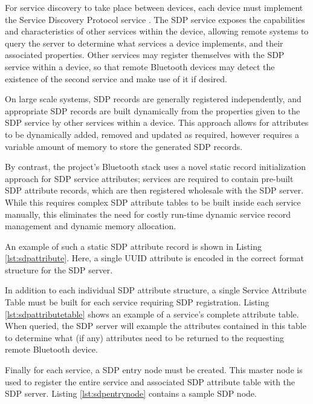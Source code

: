 For service discovery to take place between devices, each device must implement the Service Discovery Protocol service \cite{bt2p1specs_sdp}. The SDP service exposes the capabilities and characteristics of other services within the device, allowing remote systems to query the server to determine what services a device implements, and their associated properties. Other services may register themselves with the SDP service within a device, so that remote Bluetooth devices may detect the existence of the second service and make use of it if desired.

On large scale systems, SDP records are generally registered independently, and appropriate SDP records are built dynamically from the properties given to the SDP service by other services within a device. This approach allows for attributes to be dynamically added, removed and updated as required, however requires a variable amount of memory to store the generated SDP records. 

By contrast, the project's Bluetooth stack uses a novel static record initialization approach for SDP service attributes; services are required to contain pre-built SDP attribute records, which are then registered wholesale with the SDP server. While this requires complex SDP attribute tables to be built inside each service manually, this eliminates the need for costly run-time dynamic service record management and dynamic memory allocation.

An example of such a static SDP attribute record is shown in Listing \ref{lst:sdpattribute}. Here, a single UUID attribute is encoded in the correct format structure for the SDP server.



In addition to each individual SDP attribute structure, a single Service Attribute Table must be built for each service requiring SDP registration. Listing \ref{lst:sdpattributetable} shows an example of a service's complete attribute table. When queried, the SDP server will example the attributes contained in this table to determine what (if any) attributes need to be returned to the requesting remote Bluetooth device.



Finally for each service, a SDP entry node must be created. This master node is used to register the entire service and associated SDP attribute table with the SDP server. Listing \ref{lst:sdpentrynode} contains a sample SDP node.


